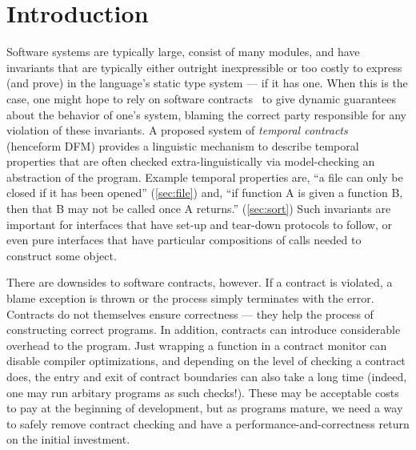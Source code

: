 \section{Introduction}

Software systems are typically large, consist of many modules, and have invariants that are typically either outright inexpressible or too costly to express (and prove) in the language's static type system --- if it has one.
%
When this is the case, one might hope to rely on software contracts~\cite{dvanhorn:Findler2002Contracts} to give dynamic guarantees about the behavior of one's system, blaming the correct party responsible for any violation of these invariants.
%
A proposed system of \emph{temporal contracts}~\citep{ianjohnson:dfm:icfp2011} (henceform DFM) provides a linguistic mechanism to describe temporal properties that are often checked extra-linguistically via model-checking an abstraction of the program.
%
Example temporal properties are, ``a file can only be closed if it has been opened'' (\cref{sec:file}) and, ``if function A is given a function B, then that B may not be called once A returns.'' (\cref{sec:sort})
%
Such invariants are important for interfaces that have set-up and tear-down protocols to follow, or even pure interfaces that have particular compositions of calls needed to construct some object.

There are downsides to software contracts, however.
%
If a contract is violated, a blame exception is thrown or the process simply terminates with the error.
%
Contracts do not themselves ensure correctness --- they help the process of constructing correct programs.
%
In addition, contracts can introduce considerable overhead to the program.
%
Just wrapping a function in a contract monitor can disable compiler optimizations, and depending on the level of checking a contract does, the entry and exit of contract boundaries can also take a long time (indeed, one may run arbitary programs as such checks!).
%
These may be acceptable costs to pay at the beginning of development, but as programs mature, we need a way to safely remove contract checking and have a performance-and-correctness return on the initial investment.

